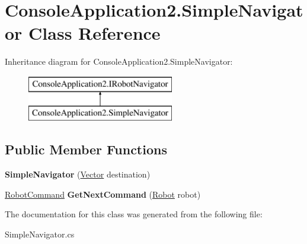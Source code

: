 \hypertarget{class_console_application2_1_1_simple_navigator}{}\section{Console\+Application2.\+Simple\+Navigator Class Reference}
\label{class_console_application2_1_1_simple_navigator}
Inheritance diagram for Console\+Application2.\+Simple\+Navigator\+:\begin{figure}[H]
\begin{center}
\leavevmode
\includegraphics[height=2.000000cm]{class_console_application2_1_1_simple_navigator}
\end{center}
\end{figure}
\subsection*{Public Member Functions}
\begin{DoxyCompactItemize}
\item 
\hypertarget{class_console_application2_1_1_simple_navigator_a362da36b2f55727ed33b2414bb0f5dec}{}{\bfseries Simple\+Navigator} (\hyperlink{class_console_application2_1_1_vector}{Vector} destination)\label{class_console_application2_1_1_simple_navigator_a362da36b2f55727ed33b2414bb0f5dec}

\item 
\hypertarget{class_console_application2_1_1_simple_navigator_a506bed661ee596d9955656dbbee22fce}{}\hyperlink{class_console_application2_1_1_robot_command}{Robot\+Command} {\bfseries Get\+Next\+Command} (\hyperlink{class_console_application2_1_1_robot}{Robot} robot)\label{class_console_application2_1_1_simple_navigator_a506bed661ee596d9955656dbbee22fce}

\end{DoxyCompactItemize}


The documentation for this class was generated from the following file\+:\begin{DoxyCompactItemize}
\item 
Simple\+Navigator.\+cs\end{DoxyCompactItemize}
